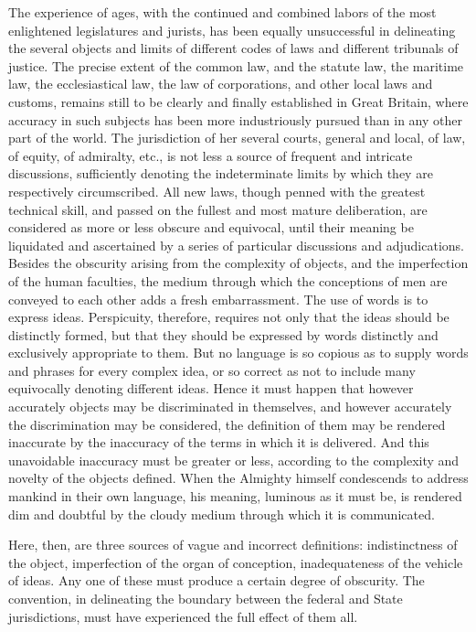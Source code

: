 The experience of ages, with the continued and combined labors of the most enlightened legislatures and jurists, has been equally unsuccessful in delineating the several objects and limits of different codes of laws and different tribunals of justice. 
The precise extent of the common law, and the statute law, the maritime law, the ecclesiastical law, the law of corporations, and other local laws and customs, remains still to be clearly and finally established in Great Britain, where accuracy in such subjects has been more industriously pursued than in any other part of the world. 
The jurisdiction of her several courts, general and local, of law, of equity, of admiralty, etc., is not less a source of frequent and intricate discussions, sufficiently denoting the indeterminate limits by which they are respectively circumscribed. 
All new laws, though penned with the greatest technical skill, and passed on the fullest and most mature deliberation, are considered as more or less obscure and equivocal, until their meaning be liquidated and ascertained by a series of particular discussions and adjudications. 
Besides the obscurity arising from the complexity of objects, and the imperfection of the human faculties, the medium through which the conceptions of men are conveyed to each other adds a fresh embarrassment. 
The use of words is to express ideas. 
Perspicuity, therefore, requires not only that the ideas should be distinctly formed, but that they should be expressed by words distinctly and exclusively appropriate to them. 
But no language is so copious as to supply words and phrases for every complex idea, or so correct as not to include many equivocally denoting different ideas. 
Hence it must happen that however accurately objects may be discriminated in themselves, and however accurately the discrimination may be considered, the definition of them may be rendered inaccurate by the inaccuracy of the terms in which it is delivered. 
And this unavoidable inaccuracy must be greater or less, according to the complexity and novelty of the objects defined. 
When the Almighty himself condescends to address mankind in their own language, his meaning, luminous as it must be, is rendered dim and doubtful by the cloudy medium through which it is communicated.

Here, then, are three sources of vague and incorrect definitions: indistinctness of the object, imperfection of the organ of conception, inadequateness of the vehicle of ideas. 
Any one of these must produce a certain degree of obscurity. 
The convention, in delineating the boundary between the federal and State jurisdictions, must have experienced the full effect of them all.

